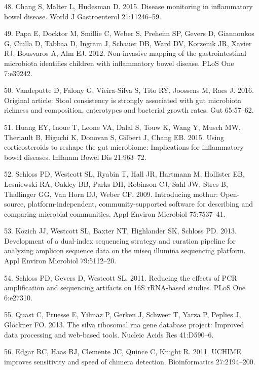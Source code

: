 \documentclass[12pt,]{article}
\begin{document}
\hypertarget{ref-chang_monitoring_2015}{}
48. Chang S, Malter L, Hudesman D. 2015. Disease monitoring in
inflammatory bowel disease. World J Gastroenterol 21:11246--59.

\hypertarget{ref-papa_pedsIBD_2012}{}
49. Papa E, Docktor M, Smillie C, Weber S, Preheim SP, Gevers D,
Giannoukos G, Ciulla D, Tabbaa D, Ingram J, Schauer DB, Ward DV,
Korzenik JR, Xavier RJ, Bousvaros A, Alm EJ. 2012. Non-invasive mapping
of the gastrointestinal microbiota identifies children with inflammatory
bowel disease. PLoS One 7:e39242.

\hypertarget{ref-vandeputte_stoolcon_2016}{}
50. Vandeputte D, Falony G, Vieira-Silva S, Tito RY, Joossens M, Raes J.
2016. Original article: Stool consistency is strongly associated with
gut microbiota richness and composition, enterotypes and bacterial
growth rates. Gut 65:57--62.

\hypertarget{ref-huang_cort_2015}{}
51. Huang EY, Inoue T, Leone VA, Dalal S, Touw K, Wang Y, Musch MW,
Theriault B, Higuchi K, Donovan S, Gilbert J, Chang EB. 2015. Using
corticosteroids to reshape the gut microbiome: Implications for
inflammatory bowel diseases. Inflamm Bowel Dis 21:963--72.

\hypertarget{ref-schloss_mothur_2009}{}
52. Schloss PD, Westcott SL, Ryabin T, Hall JR, Hartmann M, Hollister
EB, Lesniewski RA, Oakley BB, Parks DH, Robinson CJ, Sahl JW, Stres B,
Thallinger GG, Van Horn DJ, Weber CF. 2009. Introducing mothur:
Open-source, platform-independent, community-supported software for
describing and comparing microbial communities. Appl Environ Microbiol
75:7537--41.

\hypertarget{ref-Kozich_MiSeqSOP_2013}{}
53. Kozich JJ, Westcott SL, Baxter NT, Highlander SK, Schloss PD. 2013.
Development of a dual-index sequencing strategy and curation pipeline
for analyzing amplicon sequence data on the miseq illumina sequencing
platform. Appl Environ Microbiol 79:5112--20.

\hypertarget{ref-schloss_PCRartifacts_2011}{}
54. Schloss PD, Gevers D, Westcott SL. 2011. Reducing the effects of PCR
amplification and sequencing artifacts on 16S rRNA-based studies. PLoS
One 6:e27310.

\hypertarget{ref-Quast_silva_2013}{}
55. Quast C, Pruesse E, Yilmaz P, Gerken J, Schweer T, Yarza P, Peplies
J, Glöckner FO. 2013. The silva ribosomal rna gene database project:
Improved data processing and web-based tools. Nucleic Acids Res
41:D590--6.

\hypertarget{ref-edgar_uchime_2011}{}
56. Edgar RC, Haas BJ, Clemente JC, Quince C, Knight R. 2011. UCHIME
improves sensitivity and speed of chimera detection. Bioinformatics
27:2194--200.
\end{document}
